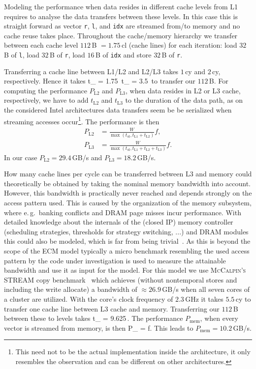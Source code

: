 Modeling the performance when data resides in different cache levels from L1
requires to analyse the data transfers between these levels.
In this case this is straight forward as vector \verb'r', \verb'l', and
\verb'idx' are streamed from/to memory and no cache reuse takes place.
Throughout the cache/memory hierarchy we transfer between each cache level
$112$\,B $= 1.75$\,cl (cache lines) for each iteration: load $32$\,B of
\verb'l', load $32$\,B of \verb'r', load $16$\,B of \verb'idx' and store $32$\,B
of \verb'r'.

Transferring a cache line between L1/L2 and L2/L3 takes $1$\,cy and $2$\,cy,
respectively. Hence it takes
%
\be
  t_ = 1.75\,\cyw {} t_ = 3.5\,\cyw
\ee
%
to transfer our $112$\,B.
For computing the performance $P_\text{L2}$ and $P_\text{L3}$, when data resides
in L2 or L3 cache, respectively, we
have to add $t_\text{L2}$ and $t_\text{L3}$ to the duration of the data path, as on the considered
Intel architectures data transfers seem be be serialized when streaming accesses
occur\footnote{This need not to be the actual implementation inside the
architecture, it only resembles the observation and can be different on other
architectures.}.
The performance is then
%
\begin{align}
  P_\text{L2} &= \frac{W}{\max(t_\text{ol}, t_\text{L1} + t_\text{L2})} f, \\
  P_\text{L3} &= \frac{W}{\max(t_\text{ol}, t_\text{L1} + t_\text{L2} +
t_\text{L3})} f.
\end{align}
%
In our case $P_\text{L2} = 29.4$\,GB/s and $P_\text{L3} = 18.2$\,GB/s.
%

How many cache lines per cycle can be transferred between L3 and memory could
theoretically be obtained by taking the nominal memory bandwidth into account.
However, this bandwidth is practically never reached and depends strongly on the
access pattern used.
This is caused by the organization of the memory subsystem, where e.\,g.\ banking
conflicts and DRAM page misses incur performance.
With detailed knowledge about the internals of the (closed IP) memory controller
(scheduling strategies, thresholds for strategy switching, ...) and DRAM modules
this could also be modeled, which is far from being trivial~\cite{jacob-2007}.
As this is beyond the scope of the ECM model typically a micro benchmark
resembling the used access pattern by the code under investigation is used
to measure the attainable bandwidth and use it as input for the model.
%
For this model we use \textsc{McCalpin's} STREAM copy
benchmark~\cite{mccalpin-1995} which achieves (without nontemporal stores and
including the write allocate) a bandwidth of $\approx 26.9$\,GB/s when all seven cores
of a cluster are utilized.
With the core's clock frequency of $2.3$\,GHz it takes $5.5$\,cy to transfer one
cache line between L3 cache and memory.
Transferring our $112$\,B between these to levels takes
%
\be
  t_ = 9.625\,\cyw.
\ee
%
The performance $P_\text{mem}$, when every vector is streamed from memory, is then
%
\be
  P_ =  f.
\ee
%
This leads to $P_\text{mem} = 10.2$\,GB/s. 

